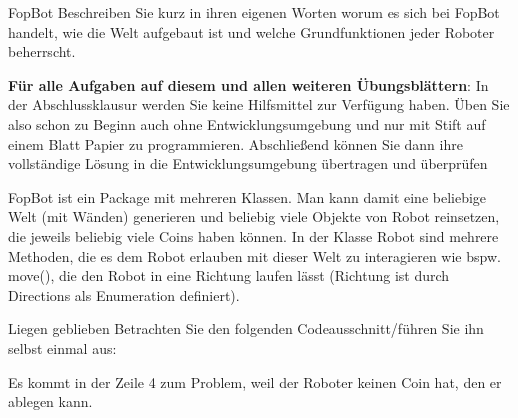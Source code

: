 \documentclass{../preamble}
\date{16.11.2020 - 20.11.2020}
\begin{document}
\maketitle

\makedisclaimer

\clearpage

\begin{task}[credit = \stars{0}{3}]{FopBot}
    Beschreiben Sie kurz in ihren eigenen Worten worum es sich bei FopBot handelt, wie die Welt aufgebaut ist und welche Grundfunktionen jeder Roboter beherrscht.

    \begin{tcolorbox}
        \textbf{Für alle Aufgaben auf diesem und allen weiteren Übungsblättern}: In der Abschlussklausur werden Sie keine Hilfsmittel zur Verfügung haben. Üben Sie also schon zu  Beginn auch ohne Entwicklungsumgebung und nur mit Stift auf einem Blatt Papier zu programmieren. Abschließend können Sie dann ihre vollständige Lösung in die Entwicklungsumgebung übertragen und überprüfen
    \end{tcolorbox}

    \begin{solution}
        FopBot ist ein Package mit mehreren Klassen. Man kann damit eine beliebige Welt (mit Wänden) generieren und beliebig viele Objekte von Robot reinsetzen, die jeweils beliebig viele Coins haben können. In der Klasse Robot sind mehrere Methoden, die es dem Robot erlauben mit dieser Welt zu interagieren wie bspw. move(), die den Robot in eine Richtung laufen lässt (Richtung ist durch Directions als Enumeration definiert).
    \end{solution}
\end{task}

\begin{task}[credit = \stars{0}{3}]{Liegen geblieben}
    Betrachten Sie den folgenden Codeausschnitt/führen Sie ihn selbst einmal aus:
    

    \begin{solution}
        Es kommt in der Zeile 4 zum Problem, weil der Roboter keinen Coin hat, den er ablegen kann.
    \end{solution}
\end{task}

\clearpage
\end{document}
